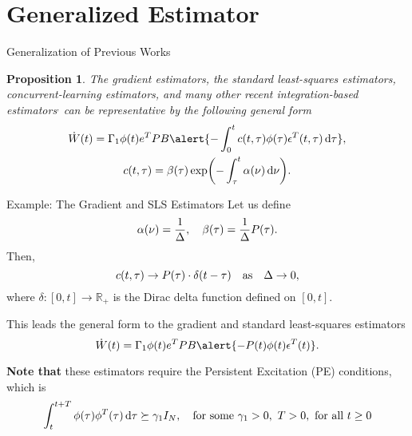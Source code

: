 \documentclass[]{beamer}
\theoremstyle{plain}
\newtheorem{proposition}{Proposition}
\theoremstyle{definition}
\theoremstyle{remark}
\newcommand{\MB}[1]{\mathbb{#1}}
\begin{document}
\section{Generalized Estimator}

\begin{frame}{Generalization of Previous Works}
	\begin{proposition}
		The gradient estimators, the standard least-squares
		estimators, concurrent-learning
		estimators, and many other recent
		integration-based estimators$^,$
		 can be representative by the following
		general form
		\begin{gather*}
			\dot{W}(t) = \Gamma_1 \phi(t) e^T P B \alert{- \int_0^t c(t, \tau)
			\phi(\tau) \epsilon^T(t, \tau) \dd{\tau}}, \\
			c(t,\tau) = \beta(\tau) \exp(- \int_\tau^t \alpha(\nu) \dd{\nu}).
		\end{gather*}
	\end{proposition}
\end{frame}

\begin{frame}{Example: The Gradient and SLS Estimators}
	Let us define
	\begin{equation*}
		\alpha(\nu) = \frac{1}{\Delta} \qc \beta(\tau) = \frac{1}{\Delta}
		P(\tau).
	\end{equation*}
	\pause
	Then,
	\begin{equation*}
		c(t, \tau) \to P(\tau) \cdot \delta(t-\tau) \qas \Delta \to 0,
	\end{equation*}
	where $\delta: [0, t] \to \MB{R}_{+}$ is the Dirac delta function defined on
	$[0, t]$.
	\pause

	This leads the general form to the gradient and standard least-squares
	estimators
	\begin{equation*}
		\dot{W}(t) = \Gamma_1 \phi(t) e^T P B \alert{- P(t) \phi(t) \epsilon^T(t)}.
	\end{equation*}

	\textbf{Note that} these estimators require the \alert{Persistent Excitation
	(PE)} conditions, which is
	\begin{equation*}
		\int_t^{t + T} \phi(\tau) \phi^T(\tau) \dd{\tau} \succeq \gamma_1 I_N \qc
		\text{for some } \gamma_1 > 0,\ T > 0,\ \text{for all } t \ge 0
	\end{equation*}
\end{frame}
\end{document}
